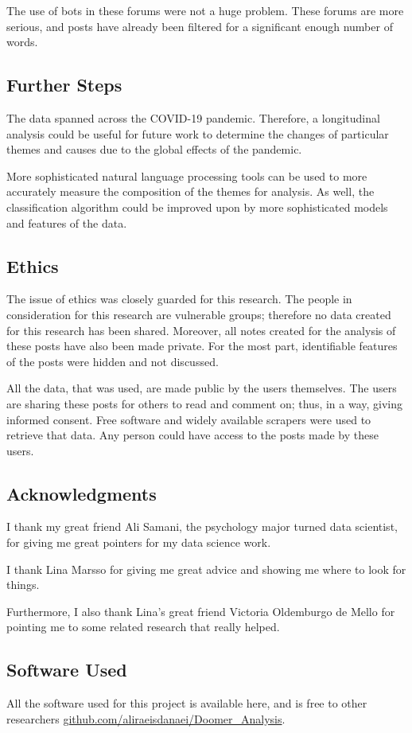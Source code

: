 \documentclass[../report.tex]{subfiles}
\begin{document}
The use of bots in these forums were not a huge problem. 
These forums are more serious, and posts have already been filtered for a significant enough number of words.

\subsection{Further Steps}
The data spanned across the COVID-19 pandemic. 
Therefore, a longitudinal analysis could be useful for future work to determine the changes of particular themes and causes due to the global effects of the pandemic.

More sophisticated natural language processing tools can be used to more accurately measure the composition of the themes for analysis. 
As well, the classification algorithm could be improved upon by more sophisticated models and features of the data. 

\subsection{Ethics}
The issue of ethics was closely guarded for this research.
The people in consideration for this research are vulnerable groups; therefore no data created for this research has been shared. 
Moreover, all notes created for the analysis of these posts have also been made private. 
For the most part, identifiable features of the posts were hidden and not discussed.

All the data, that was used, are made public by the users themselves.
The users are sharing these posts for others to read and comment on; thus, in a way, giving informed consent.
Free software and widely available scrapers were used to retrieve that data. 
Any person could have access to the posts made by these users. 

\subsection{Acknowledgments}
I thank my great friend Ali Samani, the psychology major turned data scientist, for giving me great pointers for my data science work.

I thank Lina Marsso for giving me great advice and showing me where to look for things. 

Furthermore, I also thank Lina's great friend Victoria Oldemburgo de Mello for pointing me to some related research that really helped. 

\subsection{Software Used}
All the software used for this project is available here, and is free to other researchers 
\url{github.com/aliraeisdanaei/Doomer_Analysis}.
\end{document}
